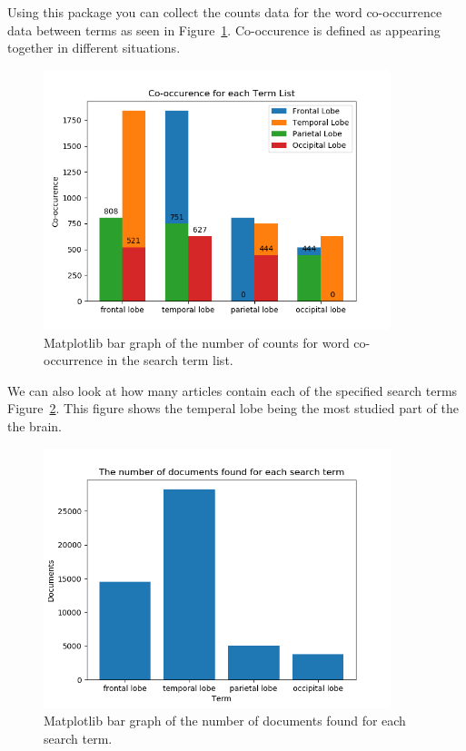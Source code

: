 \documentclass[12pt, letterpaper]{article}
\begin{document}
Using this package you can collect the counts data for the word co-occurrence data between terms as seen in Figure~\ref{fig:counts}. Co-occurence is defined as appearing together in different situations. 
% 
\begin{figure} 
  \centering 
  \includegraphics[width=0.9\textwidth]{counts}
  \caption{Matplotlib bar graph of the number of counts for word co-occurrence in the search term list.} 
  \label{fig:counts}
\end{figure}
%
We can also look at how many articles contain each of the specified search terms Figure~\ref{fig:document}. This figure shows the temperal lobe being the most studied part of the the brain.
%
\begin{figure}
  \centering
  \includegraphics[width=0.9\textwidth]{document}
  \caption{Matplotlib bar graph of the number of documents found for each search term.}
  \label{fig:document}
\end{figure}
\end{document}
